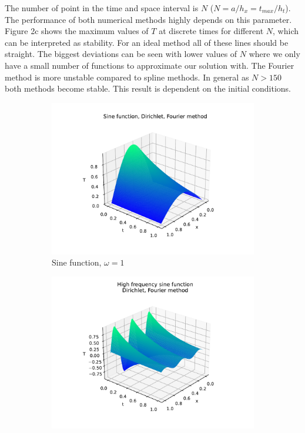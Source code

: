 \documentclass[12pt, a4paper]{article}
\begin{document}
The number of point in the time and space interval is $N$ ($N = a/h_x = t_{max}/h_t$). The performance of both numerical methods highly depends on this parameter. Figure 2c shows the maximum values of $T$ at discrete times for different $N$, which can be interpreted as stability. For an ideal method all of these lines should be straight. The biggest deviations can be seen with lower values of $N$ where we only have a small number of functions to approximate our solution with. The Fourier method is more unstable compared to spline methods. In general as $N > 150$ both methods become stable. This result is dependent on the initial conditions.

\begin{figure}[hbtp]
  \begin{subfigure}{0.5\textwidth}
  \includegraphics[width=\linewidth]{graphs/3_dodatna/sine.pdf}
  \caption{Sine function, $\omega = 1$} \label{fig:a}
  \end{subfigure}
  \hspace*{\fill}
  \begin{subfigure}{0.5\textwidth}
  \includegraphics[width=\linewidth]{graphs/3_dodatna/sine_high.pdf}

\end{subfigure}
\end{figure}
\end{document}
